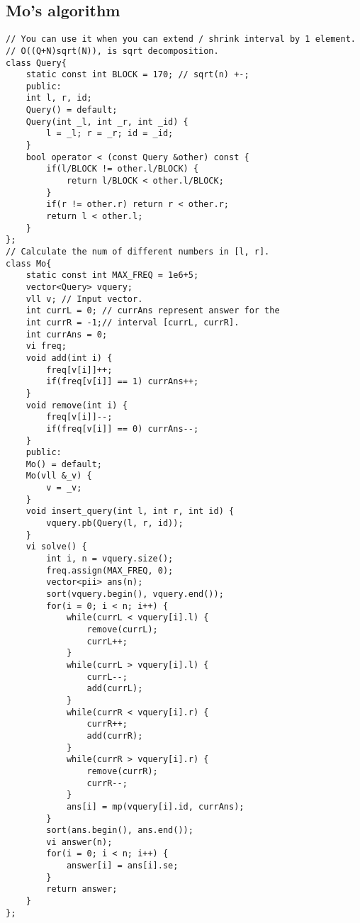 \documentclass[a4paper]{article}
\begin{document}
\subsection*{Mo's algorithm}
\begin{verbatim}
// You can use it when you can extend / shrink interval by 1 element.
// O((Q+N)sqrt(N)), is sqrt decomposition.
class Query{
    static const int BLOCK = 170; // sqrt(n) +-;
    public:
    int l, r, id;
    Query() = default;
    Query(int _l, int _r, int _id) {
        l = _l; r = _r; id = _id;
    }
    bool operator < (const Query &other) const {
        if(l/BLOCK != other.l/BLOCK) {
            return l/BLOCK < other.l/BLOCK;
        }
        if(r != other.r) return r < other.r;
        return l < other.l;
    }
};
// Calculate the num of different numbers in [l, r].
class Mo{
    static const int MAX_FREQ = 1e6+5;
    vector<Query> vquery;
    vll v; // Input vector.
    int currL = 0; // currAns represent answer for the
    int currR = -1;// interval [currL, currR].
    int currAns = 0;
    vi freq;
    void add(int i) {
        freq[v[i]]++;
        if(freq[v[i]] == 1) currAns++; 
    }
    void remove(int i) {
        freq[v[i]]--;
        if(freq[v[i]] == 0) currAns--;
    }
    public:
    Mo() = default;
    Mo(vll &_v) {
        v = _v;
    }
    void insert_query(int l, int r, int id) {
        vquery.pb(Query(l, r, id));
    }
    vi solve() {
        int i, n = vquery.size();
        freq.assign(MAX_FREQ, 0);
        vector<pii> ans(n);
        sort(vquery.begin(), vquery.end());
        for(i = 0; i < n; i++) {
            while(currL < vquery[i].l) {
                remove(currL);
                currL++;
            }
            while(currL > vquery[i].l) {
                currL--;
                add(currL);
            }
            while(currR < vquery[i].r) {
                currR++;
                add(currR);
            }
            while(currR > vquery[i].r) {
                remove(currR);
                currR--;
            }
            ans[i] = mp(vquery[i].id, currAns);
        }
        sort(ans.begin(), ans.end());
        vi answer(n);
        for(i = 0; i < n; i++) {
            answer[i] = ans[i].se;
        }
        return answer;
    }
};
\end{verbatim}
\end{document}
